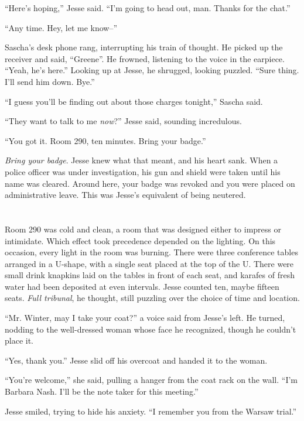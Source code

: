 \documentclass[12pt]{book}
\begin{document}
``Here's hoping,'' Jesse said.  ``I'm going to head out, man.  Thanks for the chat.''

``Any time.  Hey, let me know--''

Sascha's desk phone rang, interrupting his train of thought.  He picked up the receiver and said, ``Greene''.  He frowned, listening to the voice in the earpiece.  ``Yeah, he's here.''  Looking up at Jesse, he shrugged, looking puzzled.  ``Sure thing.  I'll send him down.  Bye.''

``I guess you'll be finding out about those charges tonight,'' Sascha said.

``They want to talk to me \emph{now}?'' Jesse said, sounding incredulous.

``You got it.  Room 290, ten minutes.  Bring your badge.''

\emph{Bring your badge}.  Jesse knew what that meant, and his heart sank.  When a police officer was under investigation, his gun and shield were taken until his name was cleared.  Around here, your badge was revoked and you were placed on administrative leave.  This was Jesse's equivalent of being neutered.

\chapter{}

Room 290 was cold and clean, a room that was designed either to impress or intimidate.  Which effect took precedence depended on the lighting.  On this occasion, every light in the room was burning.  There were three conference tables arranged in a U-shape, with a single seat placed at the top of the U.  There were small drink knapkins laid on the tables in front of each seat, and karafes of fresh water had been deposited at even intervals.  Jesse counted ten, maybe fifteen seats.  \emph{Full tribunal}, he thought, still puzzling over the choice of time and location.

``Mr. Winter, may I take your coat?'' a voice said from Jesse's left.  He turned, nodding to the well-dressed woman whose face he recognized, though he couldn't place it.

``Yes, thank you.''  Jesse slid off his overcoat and handed it to the woman.

``You're welcome,'' she said, pulling a hanger from the coat rack on the wall.  ``I'm Barbara Nash.  I'll be the note taker for this meeting.''

Jesse smiled, trying to hide his anxiety.  ``I remember you from the Warsaw trial.''
\end{document}
